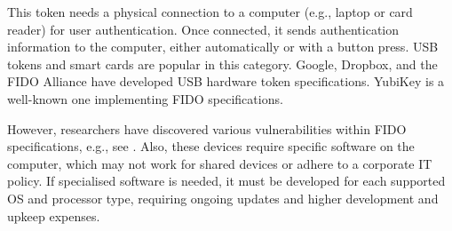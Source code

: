 






This token needs a physical connection to a computer (e.g., laptop or card reader) for user authentication. Once connected, it sends authentication information to the computer, either automatically or with a button press. USB tokens and smart cards are popular in this category. Google, Dropbox, and the FIDO Alliance have developed USB hardware token specifications. YubiKey is a well-known one implementing FIDO specifications.





However, researchers have discovered various vulnerabilities within FIDO specifications, e.g., see  \cite{PanosMNPX17,ChangMSS17,LoutfiJ15,ndss/FengLP021}.  Also, these devices require specific software on the computer, which may not work for shared devices or adhere to a corporate IT policy. If specialised software is needed, it must be developed for each supported OS and processor type, requiring ongoing updates and higher development and upkeep expenses.





